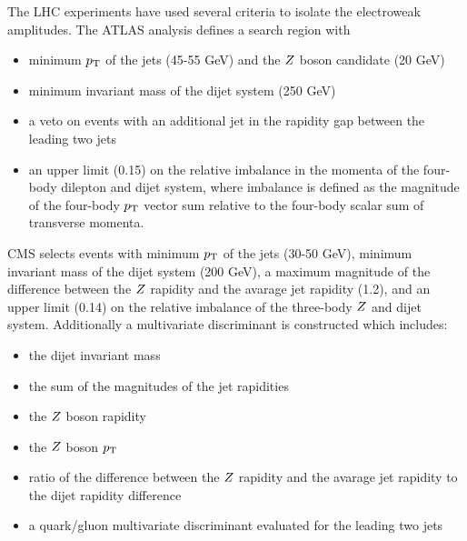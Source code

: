 The LHC experiments have used several criteria to isolate the electroweak amplitudes.  The ATLAS analysis
defines a search region with
\begin{itemize}
    \item minimum $p_{\mathrm{T}}$ of the jets (45-55 GeV) and the $Z$ boson candidate (20 GeV)
    \item minimum invariant mass of the dijet system (250 GeV)
    \item a veto on events with an additional jet in the rapidity gap between the leading two jets
    \item an upper limit (0.15) on the relative imbalance in the momenta of the four-body dilepton and dijet system, where
    imbalance is defined as the magnitude of the four-body $p_{\mathrm{T}}$ vector sum relative to the four-body scalar sum of transverse momenta.
  \end{itemize}

CMS selects events with minimum $p_{\mathrm{T}}$ of the jets (30-50 GeV), minimum invariant mass of the dijet system (200 GeV), a maximum
magnitude of the difference between the $Z$ rapidity and the avarage jet rapidity (1.2), and an upper
limit (0.14) on the relative imbalance of the three-body $Z$ and dijet system.
Additionally a multivariate discriminant is constructed which includes:
\begin{itemize}
  \item the dijet invariant mass
  \item the sum of the magnitudes of the jet rapidities
  \item the $Z$ boson rapidity
  \item the $Z$ boson $p_{\mathrm{T}}$
  \item ratio of the difference between the $Z$ rapidity and the avarage jet rapidity to the dijet rapidity difference
  \item a quark/gluon multivariate discriminant evaluated for the leading two jets
\end{itemize}

